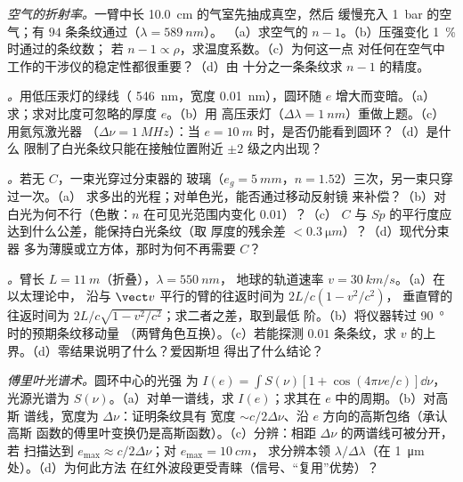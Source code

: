 \begin{exercise}[$\star\star$]\label{exo:b2:michelson:6}
\emph{空气的折射率。}一臂中长 \qty{10.0}{cm} 的气室先抽成真空，然后
缓慢充入 \qty{1}{bar} 的空气；有 $94$ 条条纹通过（$\lambda = \qty{589}{nm}$）。
（a）求空气的 $n - 1$。（b）压强变化 \qty{1}{\%} 时通过的条纹数；
若 $n - 1 \propto \rho$，求温度系数。（c）为何这一点
对任何在空气中工作的干涉仪的稳定性都很重要？（d）由
十分之一条条纹求 $n - 1$ 的精度。
\end{exercise}

\begin{exercise}[$\star\star$]\label{exo:b2:michelson:7}
\emph{。}用低压汞灯的绿线（
\qty{546}{nm}，宽度 \qty{0.01}{nm}），圆环随 $e$ 增大而变暗。（a）求；求对比度可忽略的厚度 $e$。（b）用
高压汞灯（$\Delta\lambda = \qty{1}{nm}$）重做上题。（c）用氦氖激光器
（$\Delta\nu = \qty{1}{MHz}$）：当 $e = \qty{10}{m}$ 时，是否仍能看到圆环？（d）是什么
限制了白光条纹只能在接触位置附近 $\pm2$ 级之内出现？
\end{exercise}

\begin{exercise}[$\star\star$]\label{exo:b2:michelson:8}
\emph{。}若无 $C$，一束光穿过分束器的
玻璃（$e_g = \qty{5}{mm}$，$n = 1.52$）三次，另一束只穿过一次。（a）
求多出的光程；对单色光，能否通过移动反射镜
来补偿？（b）对白光为何不行（色散：$n$
在可见光范围内变化 $0.01$）？（c）
$C$ 与 $Sp$ 的平行度应达到什么公差，能保持白光条纹（取
厚度的残余差 $< \qty{0.3}{\micro m}$）？（d）现代分束器
多为薄膜或立方体，那时为何不再需要 $C$？
\end{exercise}

\begin{exercise}[$\star\star$]\label{exo:b2:michelson:9}
\emph{。}臂长 $L = \qty{11}{m}$（折叠），$\lambda = \qty{550}{nm}$，
地球的轨道速率 $v = \qty{30}{km/s}$。（a）在以太理论中，
沿与 $\vect v$ 平行的臂的往返时间为 $2L/c(1 - v^2/c^2)$，
垂直臂的往返时间为 $2L/c\sqrt{1 - v^2/c^2}$；求二者之差，取到最低
阶。（b）将仪器转过 \qty{90}{\degree}时的预期条纹移动量
（两臂角色互换）。（c）若能探测 $0.01$ 条条纹，求
$v$ 的上界。（d）零结果说明了什么？爱因斯坦
得出了什么结论？
\end{exercise}

\begin{exercise}[$\star\star\star$]\label{exo:b2:michelson:10}
\emph{傅里叶光谱术。}圆环中心的光强
为 $I(e) = \int S(\nu)[1 + \cos(4\pi\nu e/c)]\dd\nu$，光源光谱为
$S(\nu)$。（a）对单一谱线，求 $I(e)$；求其在 $e$ 中的周期。（b）对高斯
谱线，宽度为 $\Delta\nu$：证明条纹具有
宽度 $\sim c/2\Delta\nu$、沿 $e$ 方向的高斯包络（承认高斯
函数的傅里叶变换仍是高斯函数）。（c）分辨：相距 $\Delta\nu$ 的两谱线可被分开，若
扫描达到 $e_{\max} \approx c/2\Delta\nu$；对 $e_{\max} = \qty{10}{cm}$，
求分辨本领 $\lambda/\Delta\lambda$（在 \qty{1}{\micro m} 处）。（d）为何此方法
在红外波段更受青睐（信号、“复用”优势）？
\end{exercise}

